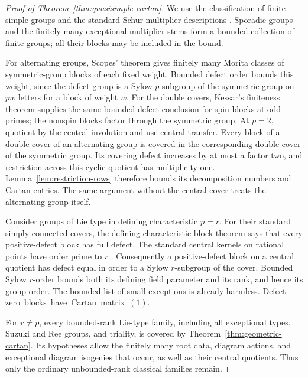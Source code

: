 \begin{proof}[Proof of Theorem~\ref{thm:quasisimple-cartan}]
We use the classification of finite simple groups and the standard
Schur multiplier descriptions \cite{Wilson,MalleTesterman}.
Sporadic groups and the finitely
many exceptional multiplier stems form a bounded collection of
finite groups; all their blocks may be included in the bound.

For alternating groups, Scopes' theorem \cite{Scopes} gives
finitely many Morita classes of symmetric-group blocks of each
fixed weight.  Bounded defect order bounds this weight, since
the defect group is a Sylow \(p\)-subgroup of the symmetric
group on \(pw\) letters for a block of weight \(w\).
For the double covers, Kessar's finiteness theorem
\cite{KessarSymmetric} supplies the same bounded-defect
conclusion for spin blocks at odd primes; the nonspin blocks
factor through the symmetric group.  At \(p=2\), quotient by
the central involution and use central transfer.  Every block
of a double cover of an alternating group is covered in the
corresponding double cover of the symmetric group.  Its
covering defect increases by at most a factor two, and
restriction across this cyclic quotient has multiplicity one.
Lemma~\ref{lem:restriction-rows} therefore bounds its decomposition
numbers and Cartan entries.  The same argument without the
central cover treats the alternating group itself.

Consider groups of Lie type in defining characteristic
\(p=r\).  For their standard simply connected covers, the
defining-characteristic block theorem \cite{HumphreysDefining}
says that every positive-defect block has full defect.  The
standard central kernels on rational points have order prime
to \(r\) \cite[Proposition~3.8]{BMO}.
Consequently a positive-defect block on a central
quotient has defect equal in order to a Sylow \(r\)-subgroup
of the cover.  Bounded Sylow \(r\)-order bounds both its
defining field parameter and its rank, and hence its group
order.  The bounded list of small exceptions is already harmless.
\mbox{Defect-zero blocks have Cartan matrix \((1)\).}

For \(r\ne p\), every bounded-rank Lie-type family, including
all exceptional types, Suzuki and Ree groups, and triality,
is covered by Theorem~\ref{thm:geometric-cartan}.  Its hypotheses
allow the finitely many root data, diagram actions, and
exceptional diagram isogenies that occur, as well as their
central quotients.  Thus only the ordinary unbounded-rank
classical families remain.


\end{proof}
